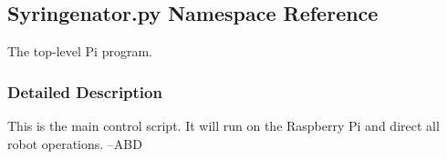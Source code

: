 \hypertarget{namespaceSyringenator_1_1py}{}\subsection{Syringenator.\+py Namespace Reference}
\label{namespaceSyringenator_1_1py}


The top-\/level Pi program.  




\subsubsection{Detailed Description}
This is the main control script. It will run on the Raspberry Pi and direct all robot operations. --A\+BD 